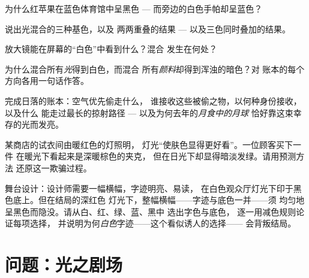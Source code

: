 \begin{exercise}[$\star$]\label{exo:g8:colors-spectra:6}
为什么红苹果在蓝色体育馆中呈黑色 ---
而旁边的白色手帕却呈蓝色？
\end{exercise}

\begin{exercise}[$\star$]\label{exo:g8:colors-spectra:7}
说出光混合的三种基色，以及
两两重叠的结果 --- 以及三色同时叠加的结果。
\end{exercise}

\begin{exercise}[$\star$]\label{exo:g8:colors-spectra:8}
放大镜能在屏幕的“白色”中看到什么？混合
发生在何处？
\end{exercise}

\begin{exercise}[$\star\star$]\label{exo:g8:colors-spectra:9}
为什么混合所有\emph{光}得到白色，而混合
所有\emph{颜料}却得到浑浊的暗色？对
账本的每个方向各用一句话作答。
\end{exercise}

\begin{exercise}[$\star\star$]\label{exo:g8:colors-spectra:10}
完成日落的账本：空气优先偷走什么，
谁接收这些被偷之物，以何种身份接收，以及什么
能走过最长的掠射路径 --- 以及为何去年的\emph{月食中的月球}
恰好靠这束幸存的光而发亮。
\end{exercise}

\begin{exercise}[$\star\star$]\label{exo:g8:colors-spectra:11}
某商店的试衣间由暖红色的灯照明，
灯光“使肤色显得更好看”。一位顾客买下一件
在暖光下看起来是深暖棕色的夹克，
但在日光下却显得暗淡发绿。请用预测方法
还原这一欺骗过程。
\end{exercise}

\begin{exercise}[$\star\star\star$]\label{exo:g8:colors-spectra:12}
舞台设计：设计师需要一幅横幅，字迹明亮、易读，
在白色观众厅灯光下印于黑色底上。但在结局的深红色
灯光下，整幅横幅——字迹与底色一并——须
均匀地呈黑色而隐没。请从白、红、绿、蓝、黑中
选出字色与底色，
逐一用减色规则论证每项选择，
并说明为何\emph{白色}字迹——这个看似诱人的选择——
会背叛结局。
\end{exercise}

\section{问题：光之剧场}

